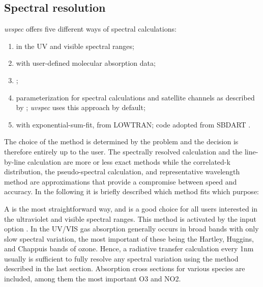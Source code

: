\subsection{Spectral resolution}

{\sl uvspec} offers five different ways of spectral calculations:
\begin{enumerate}
\item {} in the UV and visible
spectral ranges;
\item {} with user-defined molecular
absorption data;
\item {};
\item {} parameterization for spectral 
  calculations and satellite channels as described by \citet{gasteiger2014};
  {\sl uvspec} uses this approach by default;
\item {} with exponential-sum-fit,
from LOWTRAN; code adopted from SBDART \citep{Ricchiazzi1998b}.
\end{enumerate}

The choice of the method is determined by the problem and the decision
is therefore entirely up to the user. The spectrally resolved
calculation and the line-by-line calculation are more or less exact
methods while the correlated-k distribution, the pseudo-spectral
calculation, and representative wavelength method are 
approximations that provide a compromise between speed
and accuracy. In the following it is briefly described which method
fits which purpose:

A  is the most straightforward
way, and is a good choice for all users interested in the
ultraviolet and visible spectral ranges. This method is activated by the 
input option . In the UV/VIS gas absorption
generally occurs in broad bands with only slow spectral variation, the
most important of these being the Hartley, Huggins, and Chappuis bands
of ozone. Hence, a radiative transfer calculation every 1nm usually is
sufficient to fully resolve any spectral variation using the method
described in the last section. Absorption cross sections for various
species are included, among them the most important O3 and NO2.

